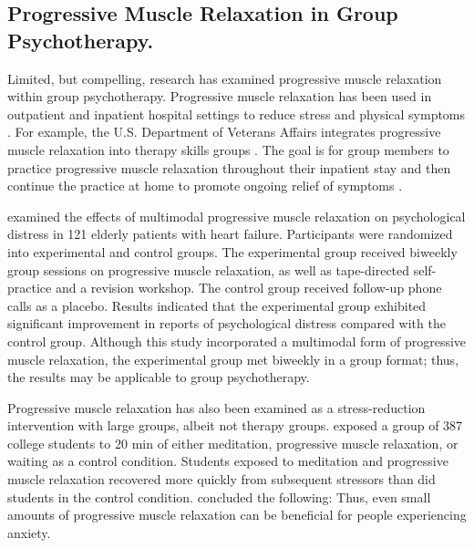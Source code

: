 \subsection*{Progressive Muscle Relaxation in Group Psychotherapy.}

Limited, but compelling, research has examined progressive muscle relaxation within group psychotherapy. Progressive muscle relaxation has been used in outpatient and inpatient hospital settings to reduce stress and physical symptoms \citep{peterson2011relaxation}. For example, the U.S. Department of Veterans Affairs integrates progressive muscle relaxation into therapy skills groups \citep{hardy2017mindfulness}. The goal is for group members to practice progressive muscle relaxation throughout their inpatient stay and then continue the practice at home to promote ongoing relief of symptoms \citep{yalom2005theory}.

\citet{yu2004relaxation} examined the effects of multimodal progressive muscle relaxation on psychological distress in 121 elderly patients with heart failure. Participants were randomized into experimental and control groups. The experimental group received biweekly group sessions on progressive muscle relaxation, as well as tape-directed self-practice and a revision workshop. The control group received follow-up phone calls as a placebo. Results indicated that the experimental group exhibited significant improvement in reports of psychological distress compared with the control group. Although this study incorporated a multimodal form of progressive muscle relaxation, the experimental group met biweekly in a group format; thus, the results may be applicable to group psychotherapy.

Progressive muscle relaxation has also been examined as a stress-reduction intervention with large groups, albeit not therapy groups. \citet{rausch2006meditation} exposed a group of 387 college students to 20 min of either meditation, progressive muscle relaxation, or waiting as a control condition. Students exposed to meditation and progressive muscle relaxation recovered more quickly from subsequent stressors than did students in the control condition. \citet{rausch2006meditation} concluded the following:  Thus, even small amounts of progressive muscle relaxation can be beneficial for people experiencing anxiety.
